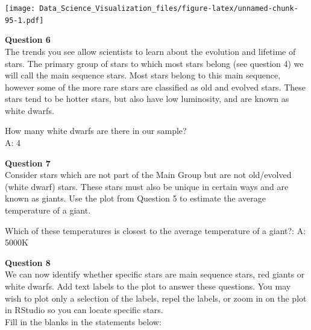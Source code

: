 \documentclass[
]{article}
\newenvironment{Shaded}{\begin{snugshade}}{\end{snugshade}}
\newcommand{\DataTypeTok}[1]{\textcolor[rgb]{0.13,0.29,0.53}{#1}}
\newcommand{\KeywordTok}[1]{\textcolor[rgb]{0.13,0.29,0.53}{\textbf{#1}}}
\newcommand{\NormalTok}[1]{#1}
\newcommand{\OperatorTok}[1]{\textcolor[rgb]{0.81,0.36,0.00}{\textbf{#1}}}
\newcommand{\StringTok}[1]{\textcolor[rgb]{0.31,0.60,0.02}{#1}}
\begin{document}
\begin{Shaded}
\end{Shaded}

\texttt{[image: Data\_Science\_Visualization\_files/figure-latex/unnamed-chunk-95-1.pdf]}

\textbf{Question 6}\\
The trends you see allow scientists to learn about the evolution and
lifetime of stars. The primary group of stars to which most stars belong
(see question 4) we will call the main sequence stars. Most stars belong
to this main sequence, however some of the more rare stars are
classified as old and evolved stars. These stars tend to be hotter
stars, but also have low luminosity, and are known as white dwarfs.

How many white dwarfs are there in our sample?\\
A: 4

\textbf{Question 7}\\
Consider stars which are not part of the Main Group but are not
old/evolved (white dwarf) stars. These stars must also be unique in
certain ways and are known as giants. Use the plot from Question 5 to
estimate the average temperature of a giant.

Which of these temperatures is closest to the average temperature of a
giant?: A: 5000K

\textbf{Question 8}\\
We can now identify whether specific stars are main sequence stars, red
giants or white dwarfs. Add text labels to the plot to answer these
questions. You may wish to plot only a selection of the labels, repel
the labels, or zoom in on the plot in RStudio so you can locate specific
stars.\\
Fill in the blanks in the statements below:
\end{document}
